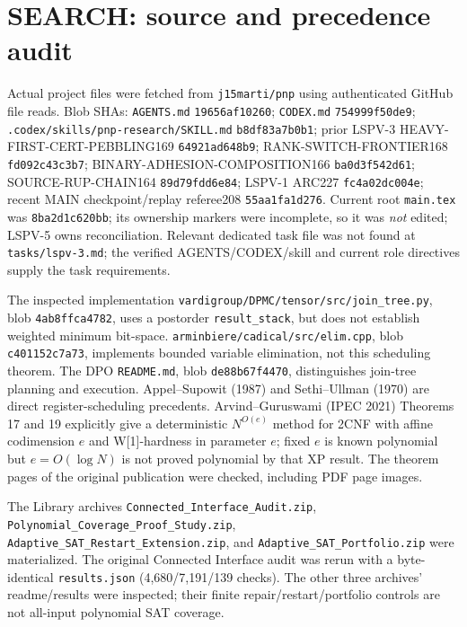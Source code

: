 \documentclass[11pt]{article}
\begin{document}
\section{SEARCH: source and precedence audit}
Actual project files were fetched from \texttt{j15marti/pnp} using authenticated GitHub file reads. Blob SHAs: \texttt{AGENTS.md} \texttt{19656af10260}; \texttt{CODEX.md} \texttt{754999f50de9}; \texttt{.codex/skills/pnp-research/SKILL.md} \texttt{b8df83a7b0b1}; prior LSPV-3 HEAVY-FIRST-CERT-PEBBLING169 \texttt{64921ad648b9}; RANK-SWITCH-FRONTIER168 \texttt{fd092c43c3b7}; BINARY-ADHESION-COMPOSITION166 \texttt{ba0d3f542d61}; SOURCE-RUP-CHAIN164 \texttt{89d79fdd6e84}; LSPV-1 ARC227 \texttt{fc4a02dc004e}; recent MAIN checkpoint/replay referee208 \texttt{55aa1fa1d276}. Current root \texttt{main.tex} was \texttt{8ba2d1c620bb}; its ownership markers were incomplete, so it was \emph{not} edited; LSPV-5 owns reconciliation. Relevant dedicated task file was not found at \texttt{tasks/lspv-3.md}; the verified AGENTS/CODEX/skill and current role directives supply the task requirements.

The inspected implementation \texttt{vardigroup/DPMC/tensor/src/join\_tree.py}, blob \texttt{4ab8ffca4782}, uses a postorder \texttt{result\_stack}, but does not establish weighted minimum bit-space. \texttt{arminbiere/cadical/src/elim.cpp}, blob \texttt{c401152c7a73}, implements bounded variable elimination, not this scheduling theorem. The DPO \texttt{README.md}, blob \texttt{de88b67f4470}, distinguishes join-tree planning and execution. Appel--Supowit (1987) and Sethi--Ullman (1970) are direct register-scheduling precedents. Arvind--Guruswami (IPEC 2021) Theorems 17 and 19 explicitly give a deterministic $N^{O(e)}$ method for 2CNF with affine codimension $e$ and W[1]-hardness in parameter $e$; fixed $e$ is known polynomial but $e=O(\log N)$ is not proved polynomial by that XP result. The theorem pages of the original publication were checked, including PDF page images.

The Library archives \texttt{Connected\_Interface\_Audit.zip}, \texttt{Polynomial\_Coverage\_Proof\_Study.zip}, \texttt{Adaptive\_SAT\_Restart\_Extension.zip}, and \texttt{Adaptive\_SAT\_Portfolio.zip} were materialized. The original Connected Interface audit was rerun with a byte-identical \texttt{results.json} (4,680/7,191/139 checks). The other three archives' readme/results were inspected; their finite repair/restart/portfolio controls are not all-input polynomial SAT coverage.
\end{document}
